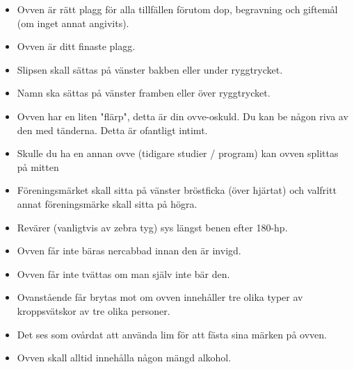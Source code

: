 \begin{itemize}
    \setlength\itemsep{-0.8em}
    \item Ovven är rätt plagg för alla tillfällen förutom dop, begravning och giftemål (om inget annat angivits).\\
    \item Ovven är ditt finaste plagg.\\
    \item Slipsen skall sättas på vänster bakben eller under ryggtrycket.\\
    \item Namn ska sättas på vänster framben eller över ryggtrycket.\\
    \item Ovven har en liten "flärp", detta är din ovve-oskuld. Du kan be någon riva av den med tänderna. Detta är ofantligt intimt.\\
    \item Skulle du ha en annan ovve (tidigare studier / program) kan ovven splittas på mitten\\
    \item Föreningsmärket skall sitta på vänster bröstficka (över hjärtat) och valfritt annat föreningsmärke skall sitta på högra.\\
    \item Revärer (vanligtvis av zebra tyg) sys längst benen efter 180-hp.\\
    \item Ovven får inte bäras nercabbad innan den är invigd.\\
    \item Ovven får inte tvättas om man själv inte bär den.\\
    \item Ovanstående får brytas mot om ovven innehåller tre olika typer av kroppsvätskor av tre olika personer.\\
    \item Det ses som ovårdat att använda lim för att fästa sina märken på ovven.\\
    \item Ovven skall alltid innehålla någon mängd alkohol.\\
\end{itemize}

